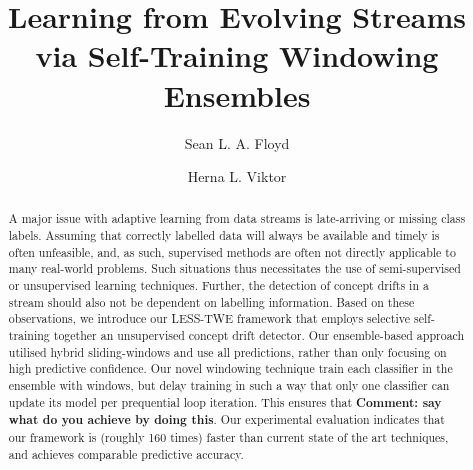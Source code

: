\documentclass[runningheads]{llncs}
\begin{document}
%
\title{Learning from Evolving Streams via Self-Training Windowing Ensembles}
%
%
\author{Sean L. A. Floyd \and
Herna L. Viktor}
%
%
%
\maketitle              %
%
\begin{abstract}
A major issue with adaptive learning from data streams is late-arriving or missing class labels. Assuming that correctly labelled data will always be available and timely is often unfeasible, and, as such, supervised methods are often not directly applicable to many real-world problems. Such situations thus necessitates the use of semi-supervised or unsupervised learning techniques. Further, the detection of concept drifts in a stream should also not be dependent on labelling information. Based on these observations, we introduce our LESS-TWE framework that employs selective self-training together an unsupervised concept drift detector. Our ensemble-based approach utilised hybrid sliding-windows and use all predictions, rather than only focusing on high predictive confidence.  Our novel windowing technique train each classifier in the ensemble with windows, but delay training in such a way that only one classifier can update its model per prequential loop iteration. This ensures that {\bf Comment: say what do you achieve by doing this}.
Our experimental evaluation indicates that our framework is (roughly 160 times) faster than current state of the art techniques, and achieves comparable predictive accuracy.

\end{abstract}
%
%
%
\end{document}

